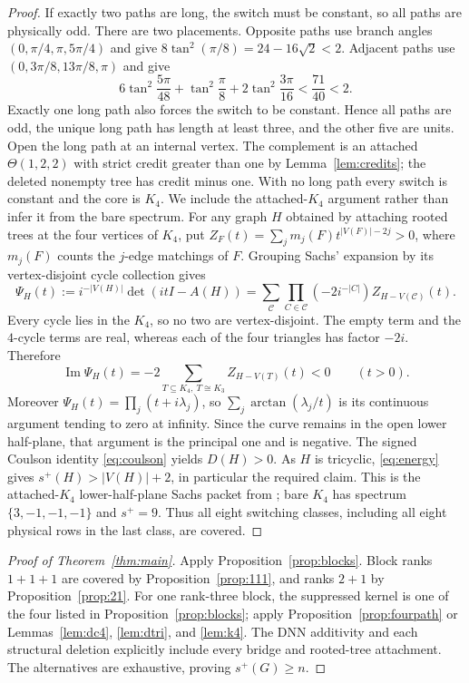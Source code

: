\documentclass[11pt]{article}
\theoremstyle{remark}
\newcommand{\splus}{s^+}
\begin{document}
\begin{proof}
If exactly two paths are long, the switch must be constant, so all paths are
physically odd.  There are two placements.  Opposite paths use branch angles
$(0,\pi/4,\pi,5\pi/4)$ and give
$8\tan^2(\pi/8)=24-16\sqrt2<2$.  Adjacent paths use
$(0,3\pi/8,13\pi/8,\pi)$ and give
\[
 6\tan^2\frac{5\pi}{48}+\tan^2\frac\pi8
 +2\tan^2\frac{3\pi}{16}<\frac{71}{40}<2.
\]
Exactly one long path also forces the switch to be constant.  Hence all paths
are odd, the unique long path has length at least three, and the other five
are units.  Open the long path at an internal vertex.  The complement is an
attached $\Theta(1,2,2)$ with strict credit greater than one by
Lemma~\ref{lem:credits}; the deleted nonempty tree has credit minus one.
With no long path every switch is constant and the core is $K_4$.  We include
the attached-$K_4$ argument rather than infer it
from the bare spectrum.  For any graph $H$ obtained by attaching rooted trees
at the four vertices of $K_4$, put
$Z_F(t)=\sum_jm_j(F)t^{|V(F)|-2j}>0$, where $m_j(F)$ counts the $j$-edge
matchings of $F$.  Grouping Sachs' expansion by its vertex-disjoint cycle
collection gives
\[
 \Psi_H(t):=i^{-|V(H)|}\det(itI-A(H))
 =\sum_{\mathcal C}\prod_{C\in\mathcal C}(-2i^{-|C|})
 Z_{H-V(\mathcal C)}(t).
\]
Every cycle lies in the $K_4$, so no two are vertex-disjoint.  The empty term
and the $4$-cycle terms are real, whereas each of the four triangles has
factor $-2i$.  Therefore
\[
 \operatorname{Im}\Psi_H(t)
 =-2\sum_{T\subseteq K_4,\ T\cong K_3}Z_{H-V(T)}(t)<0
 \qquad(t>0).
\]
Moreover $\Psi_H(t)=\prod_j(t+i\lambda_j)$, so
$\sum_j\arctan(\lambda_j/t)$ is its continuous argument tending to zero at
infinity.  Since the curve remains in the open lower half-plane, that
argument is the principal one and is negative.  The signed Coulson identity
\eqref{eq:coulson} yields $D(H)>0$.  As $H$ is tricyclic,
\eqref{eq:energy} gives $\splus(H)>|V(H)|+2$, in particular the required
claim.  This is the attached-$K_4$ lower-half-plane Sachs packet from
\cite{PackingTwo}; bare $K_4$ has spectrum $\{3,-1,-1,-1\}$ and $\splus=9$.
Thus all eight switching classes, including all eight physical rows in the
last class, are covered.
\end{proof}

\begin{proof}[Proof of Theorem~\ref{thm:main}]
Apply Proposition~\ref{prop:blocks}.  Block ranks $1+1+1$ are covered by
Proposition~\ref{prop:111}, and ranks $2+1$ by Proposition~\ref{prop:21}.
For one rank-three block, the suppressed kernel is one of the four listed in
Proposition~\ref{prop:blocks}; apply Proposition~\ref{prop:fourpath} or
Lemmas~\ref{lem:dc4}, \ref{lem:dtri}, and \ref{lem:k4}.  The DNN additivity
and each structural deletion explicitly include every bridge and rooted-tree
attachment.  The alternatives are exhaustive, proving $\splus(G)\geq n$.
\end{proof}
\end{document}
